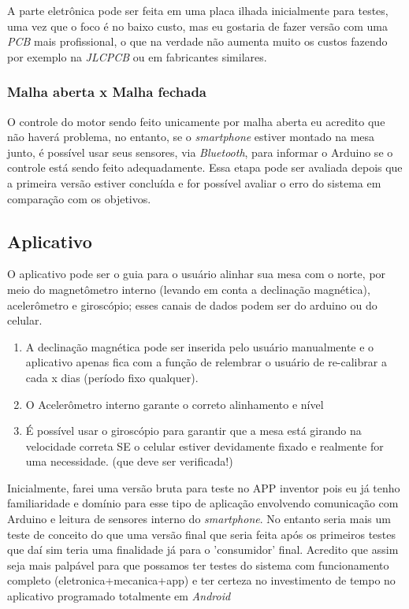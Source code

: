 \documentclass[a4paper, 12pt]{article}
\begin{document}
A parte eletrônica pode ser feita em uma placa ilhada inicialmente para testes, uma vez que o foco é no baixo custo, mas eu gostaria de fazer versão com uma \textit{PCB} mais profissional, o que na verdade não aumenta muito os custos fazendo por exemplo na \textit{JLCPCB} ou em fabricantes similares. 

\subsubsection{Malha aberta x Malha fechada}

O controle do motor sendo feito unicamente por malha aberta eu acredito que não haverá problema, no entanto, se o \textit{smartphone} estiver montado na mesa junto, é possível usar seus sensores, via \textit{Bluetooth}, para informar o Arduino se o controle está sendo feito adequadamente. Essa etapa pode ser avaliada depois que a primeira versão estiver concluída e for possível avaliar o erro do sistema em comparação com os objetivos.

\subsection{Aplicativo}

O aplicativo pode ser o guia para o usuário alinhar sua mesa com o norte, por meio do magnetômetro interno (levando em conta a declinação magnética), acelerômetro e giroscópio; esses canais de dados podem ser do arduino ou do celular. 

\begin{enumerate}
	\item A declinação magnética pode ser inserida pelo usuário manualmente e o aplicativo apenas fica com a função de relembrar o usuário de re-calibrar a cada x dias (período fixo qualquer).

	\item O Acelerômetro interno garante o correto alinhamento e nível
	
	\item É possível usar o giroscópio para garantir que a mesa está girando na velocidade correta SE o celular estiver devidamente fixado e realmente for uma necessidade. (que deve ser verificada!)
\end{enumerate}

Inicialmente, farei uma versão bruta para teste no APP inventor pois eu já tenho familiaridade e domínio para esse tipo de aplicação envolvendo comunicação com Arduino e leitura de sensores interno do \textit{smartphone}. No entanto seria mais um teste de conceito do que uma versão final que seria feita após os primeiros testes que daí sim teria uma finalidade já para o 'consumidor' final. Acredito que assim seja mais palpável para que possamos ter testes do sistema com funcionamento completo (eletronica+mecanica+app) e ter certeza no investimento de tempo no aplicativo programado totalmente em \textit{Android}
\end{document}
